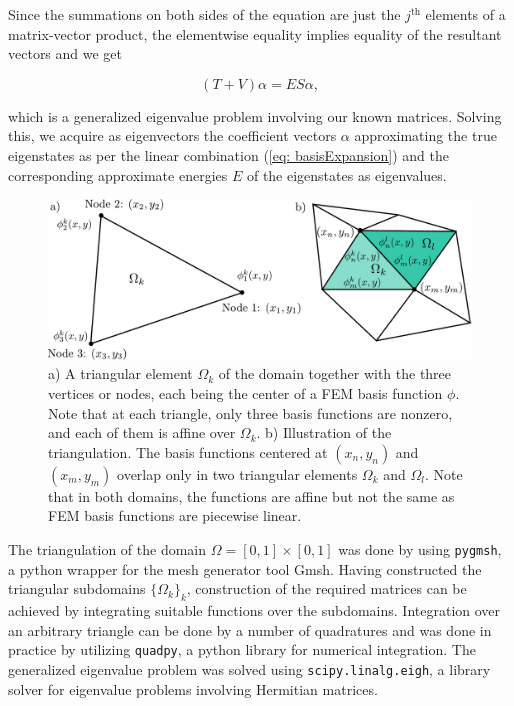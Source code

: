 \documentclass[a4paper,12pt]{article}
\begin{document}
Since the summations on both sides of the equation are just the $j^{\text{th}}$ elements of a matrix-vector product, the elementwise equality implies equality of the resultant vectors and we get

\begin{equation}
\label{eq: matrixFormFEMeq}
(T + V)\alpha = ES\alpha,
\end{equation}

which is a generalized eigenvalue problem involving our known matrices. Solving this, we acquire as eigenvectors the coefficient vectors $\alpha$ approximating the true eigenstates as per the linear combination (\ref{eq: basisExpansion}) and the corresponding approximate energies $E$ of the eigenstates as eigenvalues.





\begin{figure}[H]
\centering
\includegraphics[width=\textwidth]{../figs/triangle.pdf}
\caption{a) A triangular element $\Omega_k$ of the domain together with the three vertices or nodes, each being the center of a FEM basis function $\phi$. Note that at each triangle, only three basis functions are nonzero, and each of them is affine over $\Omega_k$. b) Illustration of the triangulation. The basis functions centered at $(x_n, y_n)$ and $(x_m, y_m)$ overlap only in two triangular elements $\Omega_k$ and $\Omega_l$. Note that in both domains, the functions are affine but not the same as FEM basis functions are piecewise linear.}
\label{fig: triangles}
\end{figure}

The triangulation of the domain $\Omega = [0,1]\times[0,1]$ was done by using \texttt{pygmsh}, a python wrapper for the mesh generator tool Gmsh. Having constructed the triangular subdomains $\lbrace \Omega_k \rbrace_k$, construction of the required matrices can be achieved by integrating suitable functions over the subdomains. Integration over an arbitrary triangle can be done by a number of quadratures and was done in practice by utilizing \texttt{quadpy}, a python library for numerical integration. The generalized eigenvalue problem was solved using \texttt{scipy.linalg.eigh}, a library solver for eigenvalue problems involving Hermitian matrices.
\end{document}
